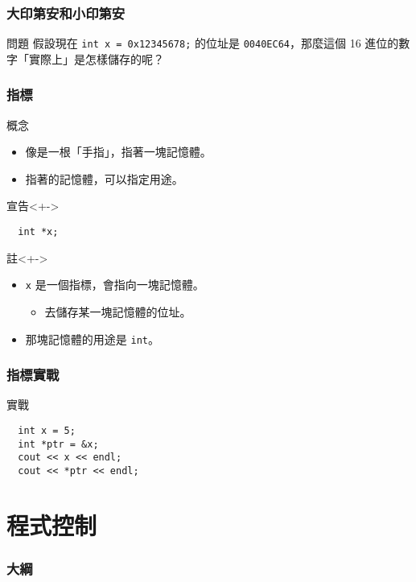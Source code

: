 \documentclass[utf8]{beamer}
\begin{document}
\begin{CJK}{UTF8}{bkai}
\begin{frame}[fragile]
  \frametitle{大印第安和小印第安}
  \begin{block}{問題}
  假設現在 \lstinline{int x = 0x12345678;}{} 的位址是 \texttt{0040EC64}，那麼這個 16 進位的數字「實際上」是怎樣儲存的呢？
  \end{block}
\end{frame}

\begin{frame}[fragile]
  \frametitle{指標}
  \begin{block}{概念}
    \begin{itemize}[<+->]
    \item 像是一根「\alert{手指}」，指著一塊記憶體。
    \item<+-> 指著的記憶體，可以指定用途。
    \end{itemize}
  \end{block}
  \begin{alertblock}{宣告}<+->
    \begin{lstlisting}
  int *x;
    \end{lstlisting}
  \end{alertblock}
  \begin{exampleblock}{註}<+->
    \begin{itemize}
    \item \lstinline{x}{} 是一個指標，會指向一塊記憶體。
      \begin{itemize}[<+->]
      \item 去\alert{儲存}某一塊記憶體的\alert{位址}。
      \end{itemize}
    \item<+-> 那塊記憶體的用途是 \lstinline{int}{}。
    \end{itemize}
  \end{exampleblock}
\end{frame}

\begin{frame}[fragile]
  \frametitle{指標實戰}
  \begin{block}{實戰}
    \begin{lstlisting}
  int x = 5;
  int *ptr = &x;
  cout << x << endl;
  cout << *ptr << endl;
    \end{lstlisting}
  \end{block}
\end{frame}

\section{程式控制}
\begin{frame}
  \frametitle{大綱}
  \begin{multicols}{2}
    \tableofcontents[currentsection]
  \end{multicols}
\end{frame}


\end{CJK}
\end{document}
